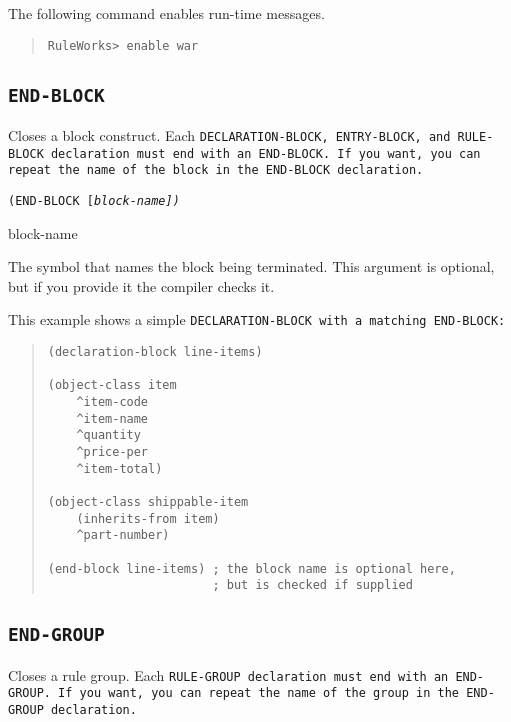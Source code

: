\Example

The following command enables run-time messages.

\begin{quote}
\begin{verbatim}
RuleWorks> enable war
\end{verbatim}
\end{quote}

\subsection{\tt{END-BLOCK}}

Closes a block construct. Each \tt{DECLARATION-BLOCK},
\tt{ENTRY-BLOCK}, and \tt{RULE-BLOCK} declaration must end with an
\tt{END-BLOCK}. If you want, you can repeat the name of the block in
the \tt{END-BLOCK} declaration.

\Format

\tt{(END-BLOCK} [\it{block-name}]\tt{)}

\begin{arguments}

\item[block-name]

  The symbol that names the block being terminated. This argument is
  optional, but if you provide it the compiler checks it.
\end{arguments}

\Example

This example shows a simple \tt{DECLARATION-BLOCK} with a matching
\tt{END-BLOCK}:
\begin{quote}
\begin{verbatim}
(declaration-block line-items)

(object-class item
    ^item-code
    ^item-name
    ^quantity
    ^price-per
    ^item-total)

(object-class shippable-item
    (inherits-from item)
    ^part-number)

(end-block line-items) ; the block name is optional here,
                       ; but is checked if supplied
\end{verbatim}
\end{quote}
                     
\subsection{\tt{END-GROUP}}

Closes a rule group. Each \tt{RULE-GROUP} declaration must end with an
\tt{END-GROUP}. If you want, you can repeat the name of the group in
the \tt{END-GROUP} declaration.

